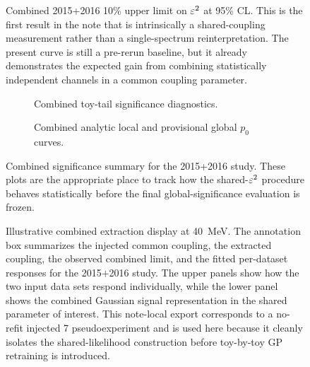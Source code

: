 \begin{figure}[H]
\centering
{}
\caption{Combined 2015+2016 10\% upper limit on $\varepsilon^2$ at 95\% CL. This is the first
result in the note that is intrinsically a shared-coupling measurement rather than a
single-spectrum reinterpretation. The present curve is still a pre-rerun baseline, but
it already demonstrates the expected gain from combining statistically independent
channels in a common coupling parameter.}
\label{fig:results-combined-1516-ul}
\end{figure}

\begin{figure}[H]
\centering
\begin{subfigure}[t]{0.48\linewidth}
  \centering
  \caption{Combined toy-tail significance diagnostics.}
\end{subfigure}
\hfill
\begin{subfigure}[t]{0.48\linewidth}
  \centering
  \caption{Combined analytic local and provisional global $p_0$ curves.}
\end{subfigure}
\caption{Combined significance summary for the 2015+2016 study. These plots are the
appropriate place to track how the shared-$\varepsilon^2$ procedure behaves statistically
before the final global-significance evaluation is frozen.}
\label{fig:results-combined-1516-significance}
\end{figure}

\begin{figure}[p]
\centering
{}
\caption{Illustrative combined extraction display at \SI{40}{MeV}. The annotation box
summarizes the injected common coupling, the extracted coupling, the observed combined
limit, and the fitted per-dataset responses for the 2015$+$2016 study. The upper
panels show how the two input data sets respond individually, while the lower panel
shows the combined Gaussian signal representation in the shared parameter of interest.
This note-local export corresponds to a no-refit injected \SI{7}{\sigma}
pseudoexperiment and is used here because it cleanly isolates the shared-likelihood
construction before toy-by-toy GP retraining is introduced.}
\label{fig:results-combined-1516-display}
\end{figure}

